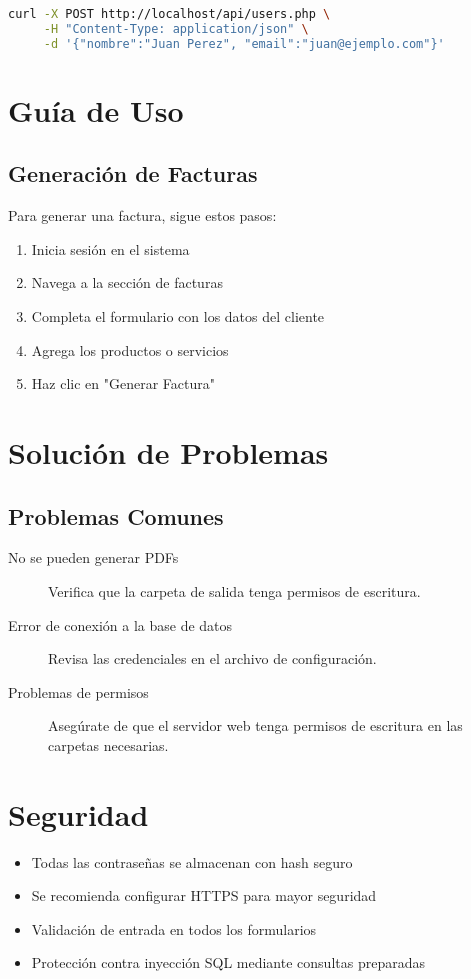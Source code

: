 \documentclass{article}
\begin{document}
\begin{lstlisting}[language=bash,caption=Ejemplo de creación de usuario]
curl -X POST http://localhost/api/users.php \
     -H "Content-Type: application/json" \
     -d '{"nombre":"Juan Perez", "email":"juan@ejemplo.com"}'
\end{lstlisting}

\section{Guía de Uso}
\subsection{Generación de Facturas}
Para generar una factura, sigue estos pasos:
\begin{enumerate}
    \item Inicia sesión en el sistema
    \item Navega a la sección de facturas
    \item Completa el formulario con los datos del cliente
    \item Agrega los productos o servicios
    \item Haz clic en "Generar Factura"
\end{enumerate}

\section{Solución de Problemas}
\subsection{Problemas Comunes}
\begin{description}
    \item[No se pueden generar PDFs] Verifica que la carpeta de salida tenga permisos de escritura.
    \item[Error de conexión a la base de datos] Revisa las credenciales en el archivo de configuración.
    \item[Problemas de permisos] Asegúrate de que el servidor web tenga permisos de escritura en las carpetas necesarias.
\end{description}

\section{Seguridad}
\begin{itemize}
    \item Todas las contraseñas se almacenan con hash seguro
    \item Se recomienda configurar HTTPS para mayor seguridad
    \item Validación de entrada en todos los formularios
    \item Protección contra inyección SQL mediante consultas preparadas
\end{itemize}
\end{document}
